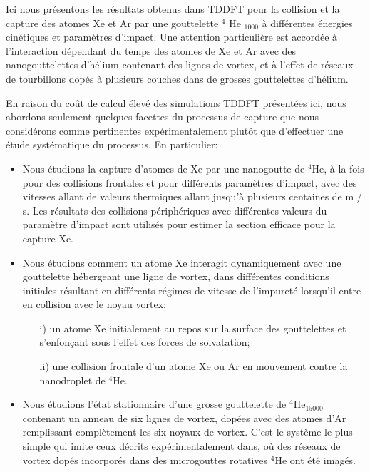 		Ici nous présentons les résultats obtenus dans TDDFT pour la collision et la capture des atomes Xe et Ar par une gouttelette $ ^ 4 $ He $ _ {1000} $ à différentes énergies cinétiques et paramètres d'impact. Une attention particulière est accordée à l'interaction dépendant du temps des atomes de Xe et Ar avec des nanogouttelettes d'hélium contenant des lignes de vortex, et à l'effet de réseaux de tourbillons dopés à plusieurs couches dans de grosses gouttelettes d'hélium.
		
		En raison du coût de calcul élevé des simulations TDDFT présentées ici, nous abordons seulement quelques facettes du processus de capture que nous considérons comme pertinentes expérimentalement plutôt que d'effectuer une étude systématique du processus. En particulier:
		\begin{itemize}
			\item Nous étudions la capture d'atomes de Xe par une nanogoutte de $^4$He, à la fois pour des collisions frontales et pour différents paramètres d'impact, avec des vitesses allant de valeurs thermiques allant jusqu'à plusieurs centaines de m / s. Les résultats des collisions périphériques avec différentes valeurs du paramètre d'impact sont utilisés pour estimer la section efficace pour la capture Xe.
			\item Nous étudions comment un atome Xe interagit dynamiquement avec une gouttelette hébergeant une ligne de vortex, dans différentes conditions initiales résultant en différents régimes de vitesse de l'impureté lorsqu'il entre en collision avec le noyau vortex:
			\begin{enumerate}
				\item[i)] un atome Xe initialement au repos sur la surface des gouttelettes et s'enfonçant sous l'effet des forces de solvatation;
				\item[ii)] une collision frontale d'un atome Xe ou Ar en mouvement contre la nanodroplet de $^4$He.
			\end{enumerate}
			\item Nous étudions l'état stationnaire d'une grosse gouttelette de $^4$He$_{15000}$ contenant un anneau de six lignes de vortex, dopées avec des atomes d'Ar remplissant complètement les six noyaux de vortex. C'est le système le plus simple qui imite ceux décrits expérimentalement dans, où des réseaux de vortex dopés incorporés dans des microgouttes rotatives $^4$He ont été imagés.
		\end{itemize}

